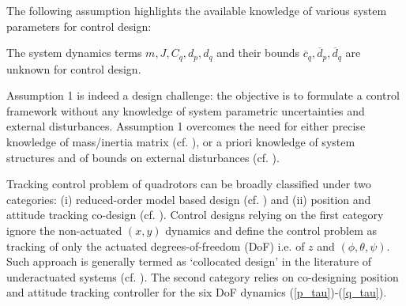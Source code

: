 The following assumption highlights the available knowledge of various system parameters for control design:
\begin{assum}
The system dynamics terms $m,J,C_q,d_p,d_q$ and their bounds $\overline{c}_q, \overline{d}_p, \overline{d}_q$ are unknown for control design.
\end{assum}
\begin{remark}
Assumption 1 is indeed a design challenge: the objective is to formulate a control framework without any knowledge of system parametric uncertainties and external disturbances. Assumption 1 overcomes the need for either precise knowledge of mass/inertia matrix (cf. \cite{xu2008sliding, sanchez2012continuous, derafa2012super, madani2007sliding}), or a priori knowledge of system structures and of bounds on external disturbances (cf. \cite{nicol2011robust, bialy2013lyapunov, dydek2012adaptive, ha2014passivity, tran2018adaptive, tian2019adaptive, zhao2014nonlinear, yang2019energy}).
\end{remark}
\begin{remark}\label{rem_co}
Tracking control problem of quadrotors can be broadly classified under two categories: (i) reduced-order model based design (cf. \cite{nicol2011robust, dydek2012adaptive, ha2014passivity, mofid2018adaptive}) and (ii) position and attitude tracking co-design (cf. \cite{bialy2013lyapunov, mellinger2011minimum}). Control designs relying on the first category ignore the non-actuated $(x,y)$ dynamics and define the control problem as tracking of only the actuated degrees-of-freedom (DoF) i.e. of $z$ and $(\phi, \theta ,\psi)$. Such approach is generally termed as `collocated design' in the literature of underactuated systems (cf. \cite{roy2020towards}). The second category relies on co-designing position and attitude tracking controller for the six DoF dynamics (\ref{p_tau})-(\ref{q_tau}). 
\end{remark}

